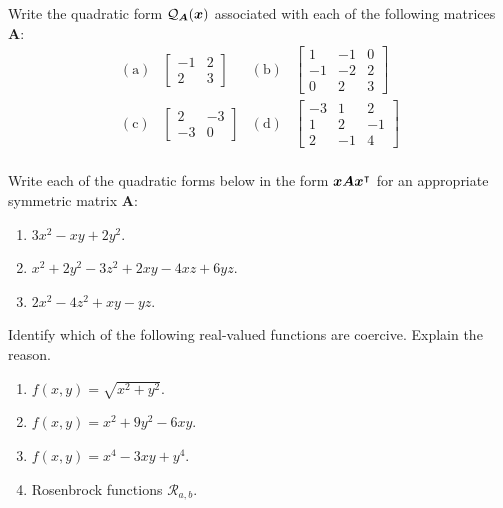 \begin{problem}[Basic]\cite[p.31, \#3]{peressini1988mathematics}
Write the quadratic form $\mathcal{Q}_{\boldsymbol{A}}(\boldsymbol{x})$ associated with each of the following matrices $\boldsymbol{A}$:
\begin{align*}
\mathrm{(a)} & \begin{bmatrix} -1 & 2 \\ 2 & 3 \end{bmatrix} &
\mathrm{(b)} & \begin{bmatrix} 1 & -1 & 0 \\ -1 & -2 & 2 \\ 0 & 2 & 3 \end{bmatrix} \\
\mathrm{(c)} & \begin{bmatrix} 2 & -3 \\ -3 & 0 \end{bmatrix} &
\mathrm{(d)} & \begin{bmatrix} -3 & 1 & 2 \\ 1 & 2 & -1 \\ 2 & -1 & 4 \end{bmatrix} \\
\end{align*}
\end{problem}

\begin{problem}[Basic]\cite[p.32, \#4]{peressini1988mathematics}
Write each of the quadratic forms below in the form $\boldsymbol{x} \boldsymbol{A} {\boldsymbol{x}}^\intercal$ for an appropriate symmetric matrix $\boldsymbol{A}$:
\begin{enumerate}
\item $3x^2-xy+2y^2$.
\item $x^2+2y^2-3z^2+2xy-4xz+6yz$.
\item $2x^2-4z^2+xy-yz$.
\end{enumerate}
\end{problem}

\begin{problem}[Intermediate]
Identify which of the following real-valued functions are coercive.  Explain the reason.
\begin{enumerate}
	\item $f(x,y) = \sqrt{x^2+y^2}$.
	\item $f(x,y) = x^2 + 9y^2 - 6xy$.
	\item $f(x,y) = x^4 - 3xy +y^4$.
	\item Rosenbrock functions $\mathcal{R}_{a,b}$.
\end{enumerate}
\end{problem}

